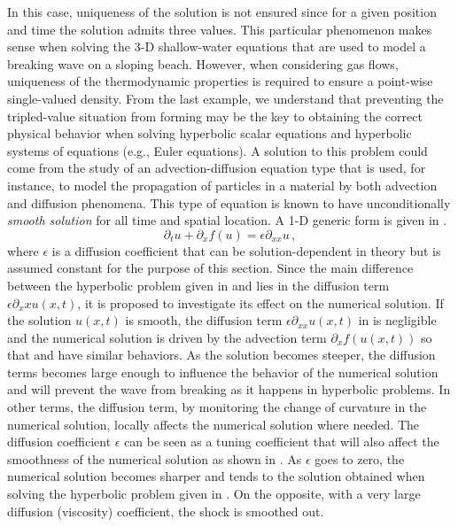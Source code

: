 %
In this case, uniqueness of the solution is not ensured since for a given position and time the solution admits three values. This particular phenomenon makes sense when solving the $3$-D shallow-water equations that are used to model a breaking wave on a sloping beach. However, when considering gas flows, uniqueness of the thermodynamic properties is required to ensure a point-wise single-valued density. From the last example, we understand that preventing the tripled-value situation from forming may be the key to obtaining the correct physical behavior when solving hyperbolic scalar equations and hyperbolic systems of equations (e.g., Euler equations). A solution to this problem could come from the study of an advection-diffusion equation type that is used, for instance, to model the propagation of particles in a material by both advection and diffusion phenomena. This type of equation is known to have unconditionally \emph{smooth solution} for all time and spatial location. A 1-D generic form is given in .
%
\begin{equation}\label{eq:adv_diff_sct1b}
\partial_t u + \partial_x f(u) = \epsilon \partial_{xx} u \,,
\end{equation}
% 
where $\epsilon$ is a diffusion coefficient that can be solution-dependent in theory but is assumed constant for the purpose of this section. Since the main difference between the hyperbolic problem given in  and  lies in the diffusion term $\epsilon \partial_xx u(x,t)$, it is proposed to investigate its effect on the numerical solution. If the solution $u(x,t)$ is smooth, the diffusion term $\epsilon \partial_{xx} u(x,t)$ in  is negligible and the numerical solution is driven by the advection term $\partial_x f(u(x,t))$ so that  and  have similar behaviors. As the solution becomes steeper, the diffusion terms becomes large enough to influence the behavior of the numerical solution and will prevent the wave from breaking as it happens in hyperbolic problems. In other terms, the diffusion term, by monitoring the change of curvature in the numerical solution, locally affects the numerical solution where needed. The diffusion coefficient $\epsilon$ can be seen as a tuning coefficient that will also affect the smoothness of the numerical solution as shown in . As $\epsilon$ goes to zero, the numerical solution becomes sharper and tends to the solution obtained when solving the hyperbolic problem given in . On the opposite, with a very large diffusion (viscosity) coefficient, the shock is smoothed out.
